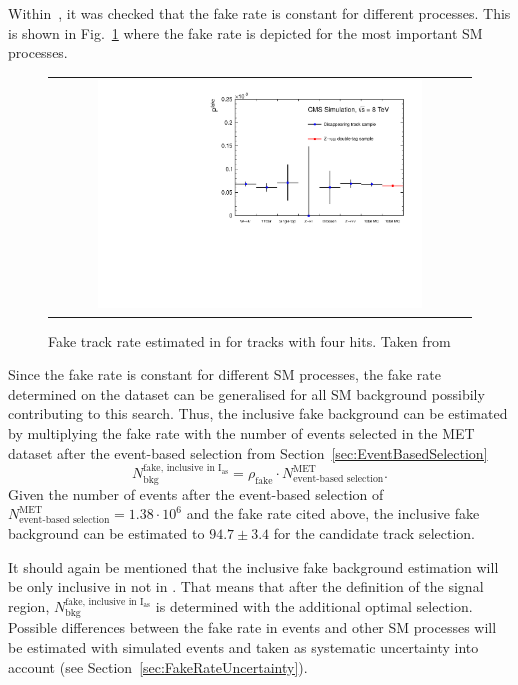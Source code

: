 Within~\cite{bib:CMS:DT_Thesis,bib:CMS:DT_8TeV_AN}, it was checked that the fake rate is constant for different processes.
This is shown in Fig.~\ref{fig:FakeRate} where the fake rate is depicted for the most important SM processes.
\begin{figure}[!b]
  \centering 
  \begin{tabular}{c}
    \includegraphics[width=0.79\textwidth]{figures/analysis/Background/fakeTrkRates.pdf}
  \end{tabular}
  \caption{Fake track rate estimated in \cite{bib:CMS:DT_Thesis,bib:CMS:DT_8TeV_AN} for tracks with four hits. Taken from \cite{bib:CMS:DT_8TeV_AN} }
  \label{fig:FakeRate}
\end{figure}
Since the fake rate is constant for different SM processes, the fake rate determined on the \Zlep dataset can be generalised for all SM background possibily contributing to this search.
Thus, the inclusive fake background can be estimated by multiplying the fake rate with the number of events selected in the MET dataset after the event-based selection from Section~\ref{sec:EventBasedSelection}
\begin{equation*}
N^{\text{fake, inclusive in I$_{\text{as}}$}}_{\text{bkg}} = \rho_{\text{fake}} \cdot N_{\text{event-based selection}}^{\text{MET}}.
\end{equation*}
Given the number of events after the event-based selection of $N_{\text{event-based selection}}^{\text{MET}} = 1.38\cdot10^6$ and the fake rate cited above, 
the inclusive fake background can be estimated to $94.7\pm3.4$ for the candidate track selection.

It should again be mentioned that the inclusive fake background estimation will be only inclusive in \ias not in \pt.
That means that after the definition of the signal region, $N^{\text{fake, inclusive in I$_{\text{as}}$}}_{\text{bkg}}$ is determined with the additional optimal \pt selection.
Possible differences between the fake rate in \Zlep events and other SM processes will be estimated with simulated events and taken as systematic uncertainty into account (see Section~\ref{sec:FakeRateUncertainty}).

